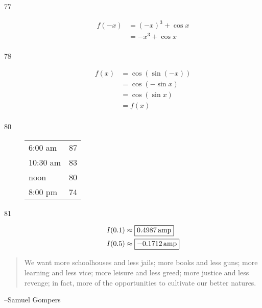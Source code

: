 \documentclass{exam}
\begin{document}
\begin{description}
      \item[77]
        \begin{align*}
          f(-x) & = (-x)^3 + \cos x \\
                & = - x^3 + \cos x \\
        \end{align*}

      \item[78]
        \begin{align*}
          f(x) & = \cos (\sin (-x)) \\
               & = \cos (- \sin x) \\
               & = \cos (\sin x) \\
               & = f(x) \\
        \end{align*}

      \item[80]
        \begin{tabular}[H]{lr}
          \toprule
          6:00 am  & 87 \\
          10:30 am & 83 \\
          noon     & 80 \\
          8:00 pm  & 74 \\
          \bottomrule
        \end{tabular}

      \item[81]
        \begin{align*}
          I(0.1) & \approx \boxed{ \unit[0.4987]{amp} } \\
          I(0.5) & \approx \boxed{ \unit[-0.1712]{amp} } \\
        \end{align*}
    \end{description}
  \else
    \vspace{9 cm}
    \begin{quote}
      \begin{em}
        We want more schoolhouses and less jails; more books and less guns; more learning and less vice; more
        leisure and less greed; more justice and less revenge; in fact, more of the opportunities to cultivate our
        better natures.
      \end{em}
    \end{quote}
    \hspace{1 cm} --Samuel Gompers
  \fi
\end{document}
